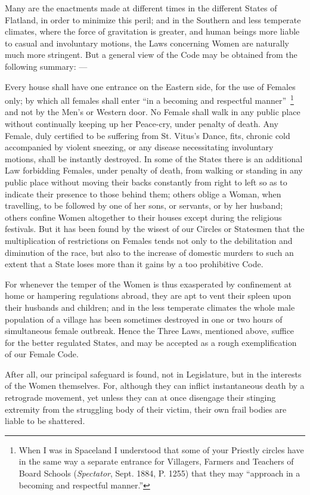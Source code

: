 \documentclass[10pt, kindle, oneside]{kindle}
\begin{document}
Many are the enactments made at different times in the different States of
Flatland, in order to minimize this peril; and in the Southern and less
temperate climates, where the force of gravitation is greater, and human
beings more liable to casual and involuntary motions, the Laws concerning
Women are naturally much more stringent. But a general view of the Code may be
obtained from the following summary: ---

Every house shall have one entrance on the Eastern side, for the use of
Females only; by which all females shall enter ``in a becoming and respectful
manner''~\footnote{When I was in Spaceland I understood that some of your
Priestly circles have in the same way a separate entrance for Villagers,
Farmers and Teachers of Board Schools (\emph{Spectator}, Sept. 1884, P. 1255) that
they may ``approach in a becoming and respectful manner.''} and not by the Men's
or Western door.  No Female shall walk in any public place without continually
keeping up her Peace-cry, under penalty of death.  Any Female, duly certified
to be suffering from St. Vitus's Dance, fits, chronic cold accompanied by
violent sneezing, or any disease necessitating involuntary motions, shall be
instantly destroyed.  In some of the States there is an additional Law
forbidding Females, under penalty of death, from walking or standing in any
public place without moving their backs constantly from right to left so as to
indicate their presence to those behind them; others oblige a Woman, when
travelling, to be followed by one of her sons, or servants, or by her husband;
others confine Women altogether to their houses except during the religious
festivals. But it has been found by the wisest of our Circles or Statesmen
that the multiplication of restrictions on Females tends not only to the
debilitation and diminution of the race, but also to the increase of domestic
murders to such an extent that a State loses more than it gains by a too
prohibitive Code.

For whenever the temper of the Women is thus exasperated by confinement at
home or hampering regulations abroad, they are apt to vent their spleen upon
their husbands and children; and in the less temperate climates the whole male
population of a village has been sometimes destroyed in one or two hours of
simultaneous female outbreak. Hence the Three Laws, mentioned above, suffice
for the better regulated States, and may be accepted as a rough
exemplification of our Female Code.

After all, our principal safeguard is found, not in Legislature, but in the
interests of the Women themselves. For, although they can inflict
instantaneous death by a retrograde movement, yet unless they can at once
disengage their stinging extremity from the struggling body of their victim,
their own frail bodies are liable to be shattered.
\end{document}

